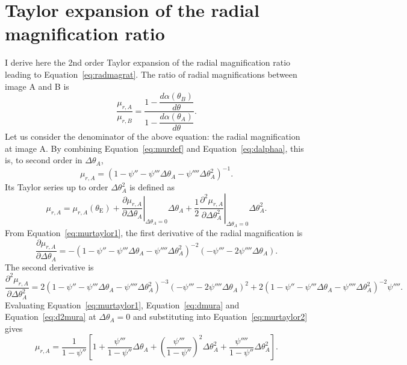 \documentclass[usenatbib]{mnras}
\def\psiii{\psi''}
\def\psiiii{\psi'''}
\def\psiiv{\psi''''}
\def\tein{\theta_{\mathrm{E}}}
\def\Eref#1{Equation~\ref{#1}\xspace}
\begin{document}
\section{Taylor expansion of the radial magnification ratio}\label{sect:appendixb}
I derive here the 2nd order Taylor expansion of the radial magnification ratio leading to \Eref{eq:radmagrat}.
The ratio of radial magnifications between image A and B is
\begin{equation}\label{eq:numden}
\frac{\mu_{r,A}}{\mu_{r,B}} = \dfrac{1 - \dfrac{d\alpha(\theta_B)}{d\theta}}{1 - \dfrac{d\alpha(\theta_A)}{d\theta}}.
\end{equation}
Let us consider the denominator of the above equation: the radial magnification at image A. By combining \Eref{eq:murdef} and \Eref{eq:dalphaa}, this is, to second order in $\Delta\theta_A$,
\begin{equation}\label{eq:murtaylor1}
\mu_{r,A} = \left(1 - \psiii - \psiiii\Delta\theta_A - \psiiv\Delta\theta_A^2\right)^{-1}.
\end{equation}
Its Taylor series up to order $\Delta\theta_A^2$ is defined as
\begin{equation}\label{eq:murtaylor2}
\mu_{r,A} = \mu_{r,A}(\tein) + \left. \frac{\partial \mu_{r,A}}{\partial \Delta\theta_A} \right\rvert_{\Delta\theta_A=0}\Delta\theta_A + \frac12\left.\frac{\partial^2 \mu_{r,A}}{\partial \Delta\theta_A^2}\right\rvert_{\Delta\theta_A=0}\Delta\theta_A^2.
\end{equation}
From \Eref{eq:murtaylor1}, the first derivative of the radial magnification is
\begin{equation}\label{eq:dmura}
\frac{\partial \mu_{r,A}}{\partial \Delta\theta_A} = -\left(1 - \psiii - \psiiii\Delta\theta_A - \psiiv\Delta\theta_A^2\right)^{-2}(-\psiiii - 2\psiiv\Delta\theta_A).
\end{equation}
The second derivative is
\begin{equation}\label{eq:d2mura}
\frac{\partial^2 \mu_{r,A}}{\partial \Delta\theta_A^2} = 2\left(1 - \psiii - \psiiii\Delta\theta_A - \psiiv\Delta\theta_A^2\right)^{-3}(-\psiiii - 2\psiiv\Delta\theta_A)^2 + 2\left(1 - \psiii - \psiiii\Delta\theta_A - \psiiv\Delta\theta_A^2\right)^{-2}\psiiv.
\end{equation}
Evaluating \Eref{eq:murtaylor1}, \Eref{eq:dmura} and \Eref{eq:d2mura} at $\Delta\theta_A=0$ and substituting into \Eref{eq:murtaylor2} gives
\begin{equation}\label{eq:mura}
\mu_{r,A} = \frac{1}{1-\psiii}\left[1 + \frac{\psiiii}{1-\psiii}\Delta\theta_A + \left(\frac{\psiiii}{1-\psiii}\right)^2\Delta\theta_A^2 + \frac{\psiiv}{1-\psiii}\Delta\theta_A^2\right].
\end{equation}
\end{document}

